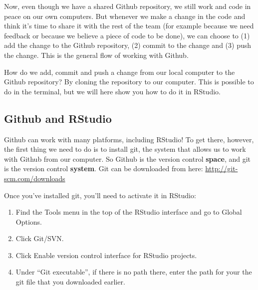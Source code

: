 \documentclass[
]{article}
\providecommand{\tightlist}{%
  \setlength{\itemsep}{0pt}\setlength{\parskip}{0pt}}
\begin{document}
Now, even though we have a shared Github repository, we still work and
code in peace on our own computers. But whenever we make a change in the
code and think it's time to share it with the rest of the team (for
example because we need feedback or because we believe a piece of code
to be done), we can choose to (1) add the change to the Github
repository, (2) commit to the change and (3) push the change. This is
the general flow of working with Github.

How do we add, commit and push a change from our local computer to the
Github repository? By cloning the repository to our computer. This is
possible to do in the terminal, but we will here show you how to do it
in RStudio.

\hypertarget{github-and-rstudio}{%
\subsection{Github and RStudio}\label{github-and-rstudio}}

Github can work with many platforms, including RStudio! To get there,
however, the first thing we need to do is to install git, the system
that allows us to work with Github from our computer. So Github is the
version control \textbf{space}, and git is the version control
\textbf{system}. Git can be downloaded from here:
\url{http://git-scm.com/downloads}

Once you've installed git, you'll need to activate it in RStudio:

\begin{enumerate}
\def\labelenumi{\arabic{enumi}.}
\tightlist
\item
  Find the Tools menu in the top of the RStudio interface and go to
  Global Options.
\item
  Click Git/SVN.
\item
  Click Enable version control interface for RStudio projects.
\item
  Under ``Git executable'', if there is no path there, enter the path
  for your the git file that you downloaded earlier.
\end{enumerate}
\end{document}
